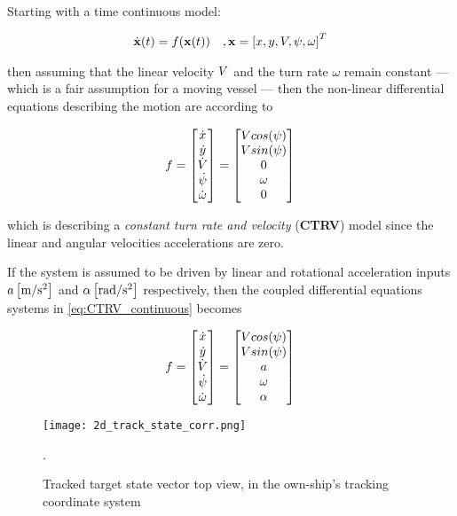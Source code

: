 Starting with a time continuous model:

\begin{equation}
\begin{aligned}\dot{\mathbf{x}}(t) = f(\mathbf{x}(t)) &&,\mathbf{x} = \left[x,y,{V}, {\psi},\omega\right]^{T}  \end{aligned}
\end{equation}


then assuming that the linear velocity ${V}$ and the turn rate $\omega$ remain constant  --- which is a fair assumption for a moving vessel --- then the non-linear differential equations describing the motion are according to \cite{Schubert2008}

\begin{equation}\label{eq:CTRV_continuous}
f =\begin{bmatrix}\dot{x} \\ \dot{y} \\ \dot{{V}} \\ \dot{{\psi}} \\ \dot{\omega}  \end{bmatrix}=  \begin{bmatrix}{V} cos({\psi}) \\ {V} sin({\psi}) \\ 0 \\ \omega \\ 0  \end{bmatrix}
\end{equation}

which is describing a \emph{constant turn rate and velocity} (\textbf{CTRV}) model since the linear and angular velocities accelerations are zero.

If the system is assumed to be driven by linear and rotational acceleration inputs $a \left[\si{\meter\per\second^2}\right]$ and $\alpha \left[\si{\radian\per\second^2}\right]$ respectively, then the coupled differential equations systems in \eqref{eq:CTRV_continuous} becomes

\begin{equation}\label{eq:CTRV_driven}
f =\begin{bmatrix}\dot{x} \\ \dot{y} \\ \dot{{V}} \\ \dot{{\psi}} \\ \dot{\omega}  \end{bmatrix}=  \begin{bmatrix}{V} cos({\psi}) \\ {V} sin({\psi}) \\ {a} \\ \omega \\ {\alpha}  \end{bmatrix}
\end{equation}
\begin{figure}[H]
	\centering
	\texttt{[image: 2d\_track\_state\_corr.png]}
	\caption{Tracked target state vector top view, in the own-ship's tracking coordinate system}.
	\label{fig:state_vector}
\end{figure}

